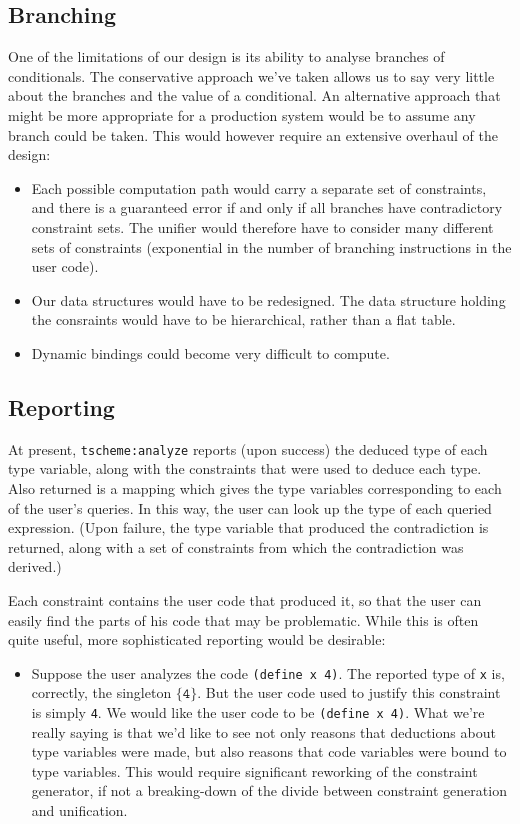 \documentclass[a4paper]{article}
\newcommand{\T}[1]{\texttt{#1}}
\begin{document}
\subsection{Branching}
One of the limitations of our design is its ability to analyse branches of 
conditionals.  The conservative approach we've taken allows us to say very 
little about the branches and the value of a conditional.  An alternative 
approach that might be more appropriate for a production system would be to 
assume any branch could be taken.  This would however require an extensive
overhaul of the design:
\begin{itemize}
  \item Each possible computation path would carry a separate set of
    constraints, and there is a guaranteed error if and only if all branches
    have contradictory constraint sets.  The unifier would therefore have to
    consider many different sets of constraints (exponential in the number of
    branching instructions in the user code).
    
  \item Our data structures would have to be redesigned.  The data structure
    holding the consraints would have to be hierarchical, rather than a flat
    table.

  \item Dynamic bindings could become very difficult to compute.
\end{itemize}

\subsection{Reporting}
At present, \T{tscheme:analyze} reports (upon success) the deduced type of each
type variable, along with the constraints that were used to deduce each type.
Also returned is a mapping which gives the type variables corresponding to each
of the user's queries.  In this way, the user can look up the type of each
queried expression.  (Upon failure, the type variable that produced the
contradiction is returned, along with a set of constraints from which the
contradiction was derived.)

Each constraint contains the user code that produced it, so that the user can
easily find the parts of his code that may be problematic.  While this is often
quite useful, more sophisticated reporting would be desirable:

\begin{itemize}
  \item Suppose the user analyzes the code \T{(define x 4)}.  The reported type
    of \T{x} is, correctly, the singleton $\{\mathtt{4}\}$.  But the user code
    used to justify this constraint is simply \T{4}.  We would like the user
    code to be \T{(define x 4)}.  What we're really saying is that we'd like to
    see not only reasons that deductions about type variables were made, but
    also reasons that code variables were bound to type variables.  This would
    require significant reworking of the constraint generator, if not a
    breaking-down of the divide between constraint generation and unification.
\end{itemize}
\end{document}
